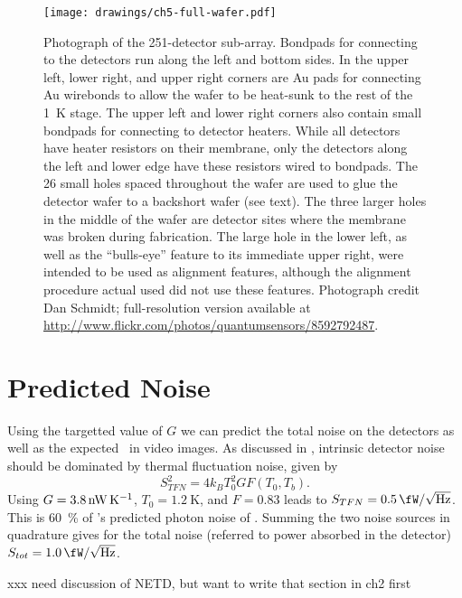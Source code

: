 \begin{figure}
\centering
\texttt{[image: drawings/ch5-full-wafer.pdf]}
\caption[Photograph of 251-detector sub-array]{
  Photograph of the 251-detector sub-array.
  Bondpads for connecting to the detectors run along the left and bottom sides.
  In the upper left, lower right, and upper right corners are Au pads for connecting Au wirebonds to allow the wafer to be heat-sunk to the rest of the \SI{1}{\K} stage.
  The upper left and lower right corners also contain small bondpads for connecting to detector heaters.
  While all detectors have heater resistors on their membrane, only the detectors along the left and lower edge have these resistors wired to bondpads.
  The 26 small holes spaced throughout the wafer are used to glue the detector wafer to a backshort wafer (see text).
  The three larger holes in the middle of the wafer are detector sites where the membrane was broken during fabrication.
  The large hole in the lower left, as well as the ``bulls-eye'' feature to its immediate upper right, were intended to be used as alignment features, although the alignment procedure actual used did not use these features.
  Photograph credit Dan Schmidt; full-resolution version available at \protect\url{http://www.flickr.com/photos/quantumsensors/8592792487}.
}
\label{fig:ch5-full-wafer}
\end{figure}

\section{Predicted Noise} \label{sec:ch5-predicted-noise}

Using the targetted value of $G$ we can predict the total noise on the detectors as well as the expected \NETD\ in video images.
As discussed in , intrinsic detector noise should be dominated by thermal fluctuation noise, given by
\begin{equation}
  S^2_{TFN} = 4 k_B T_0^2 G F(T_0, T_b).
\end{equation}
Using $G = \SI{3.8}{\nW\per\K}$, $T_0 = \SI{1.2}{\K}$, and $F = 0.83$ leads to $S_{TFN} = \Pnoisef{0.5}$.
This is \SI{60}{\percent} of 's predicted photon noise of .
Summing the two noise sources in quadrature gives for the total noise (referred to power absorbed in the detector) $S_{tot} = \Pnoisef{1.0}$.

xxx need discussion of NETD, but want to write that section in ch2 first

